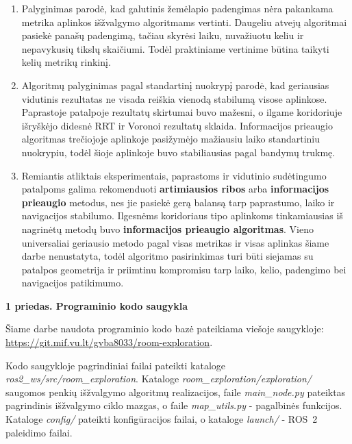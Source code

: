 \documentclass[]{VUMIFTemplateClass}
\begin{document}
\begin{enumerate}
  \item Palyginimas parodė, kad galutinis žemėlapio padengimas nėra pakankama metrika aplinkos išžvalgymo algoritmams vertinti. Daugeliu atvejų algoritmai
pasiekė panašų padengimą, tačiau skyrėsi laiku, nuvažiuotu keliu ir nepavykusių tikslų skaičiumi. Todėl praktiniame vertinime būtina taikyti kelių metrikų
rinkinį.

  \item Algoritmų palyginimas pagal standartinį nuokrypį parodė, kad geriausias vidutinis rezultatas ne visada reiškia vienodą stabilumą visose aplinkose.
Paprastoje patalpoje rezultatų skirtumai buvo mažesni, o ilgame koridoriuje išryškėjo didesnė RRT ir Voronoi rezultatų sklaida. Informacijos prieaugio
algoritmas trečiojoje aplinkoje pasižymėjo mažiausiu laiko standartiniu nuokrypiu, todėl šioje aplinkoje buvo stabiliausias pagal bandymų trukmę.

  \item Remiantis atliktais eksperimentais, paprastoms ir vidutinio sudėtingumo patalpoms galima rekomenduoti \textbf{artimiausios ribos} arba \textbf{informacijos prieaugio}
metodus, nes jie pasiekė gerą balansą tarp paprastumo, laiko ir navigacijos stabilumo. Ilgesnėms koridoriaus tipo aplinkoms tinkamiausias iš nagrinėtų metodų
buvo \textbf{informacijos prieaugio algoritmas}. Vieno universaliai geriausio metodo pagal visas metrikas ir visas aplinkas šiame darbe nenustatyta, todėl algoritmo
pasirinkimas turi būti siejamas su patalpos geometrija ir priimtinu kompromisu tarp laiko, kelio, padengimo bei navigacijos patikimumo.
\end{enumerate}

\printbibliography[heading=none]


{}
\label{priedas:kodo-saugykla}
\textbf{1 priedas. Programinio kodo saugykla}

Šiame darbe naudota programinio kodo bazė pateikiama viešoje saugykloje:
\url{https://git.mif.vu.lt/gvba8033/room-exploration}.

Kodo saugykloje pagrindiniai failai pateikti kataloge \textit{ros2\_ws/src/room\_exploration}. Kataloge \textit{room\_exploration/exploration/} saugomos
  penkių išžvalgymo algoritmų realizacijos, faile \textit{main\_node.py} pateiktas pagrindinis išžvalgymo ciklo mazgas, o faile \textit{map\_utils.py} -
  pagalbinės funkcijos. Kataloge \textit{config/} pateikti konfigūracijos failai, o kataloge \textit{launch/}
  - ROS~2 paleidimo failai.
\end{document}
